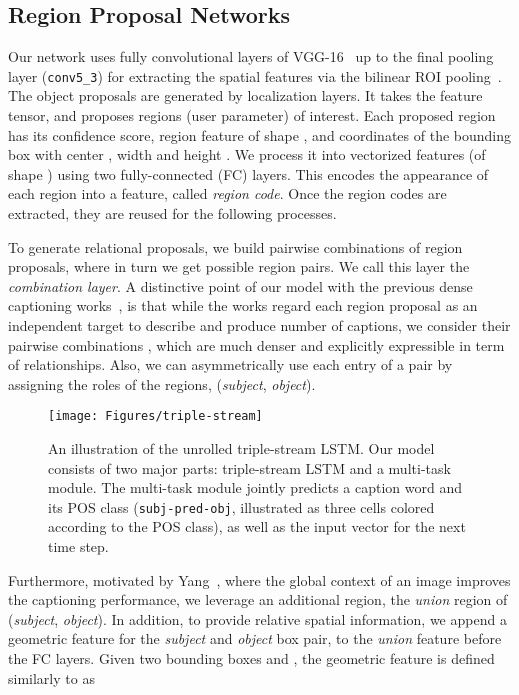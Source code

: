\documentclass[10pt,twocolumn,letterpaper]{article}
\begin{document}
\subsection{Region Proposal Networks}
Our network uses fully convolutional layers of VGG-16~\cite{simonyan2014very} up to the final pooling layer (\ie\texttt{conv5\_3}) for extracting the spatial features via the bilinear ROI pooling~\cite{johnson2016densecap}.
The object proposals are generated by localization layers.
It takes the feature tensor, and proposes  regions (user parameter) of interest.
Each proposed region has its confidence score, region feature of shape , and coordinates  of the bounding box with center , width  and height .
We process it into vectorized features (of shape ) using two fully-connected (FC) layers. 
This encodes the appearance of each region into a feature, called \emph{region code}.
Once the region codes are extracted, they are reused for the following processes.

To generate relational proposals, we build pairwise combinations of  region proposals, where in turn we get  possible region pairs.
We call this layer the \emph{combination layer}.
A distinctive point of our model with the previous dense captioning works~\cite{johnson2016densecap,Yang_2017_CVPR}, is that while the works regard each region proposal as an independent target to describe and produce  number of captions, we consider their pairwise combinations , which are much denser and explicitly expressible in term of relationships. 
Also, we can asymmetrically use each entry of a pair by assigning the roles of the regions, \ie (\emph{subject}, \emph{object}).


\begin{figure*}[t]
	\centering
	\texttt{[image: Figures/triple-stream]}
	\caption{An illustration of the unrolled triple-stream LSTM. 
		Our model consists of two major parts: triple-stream LSTM and a multi-task module.
		The multi-task module jointly predicts a caption word and its POS class (\texttt{subj-pred-obj}, illustrated as three cells colored according to the POS class), as well as the input vector for the next time step.
        \vspace{-4mm}}
	\label{fig:triple-stream}
\end{figure*}


Furthermore, motivated by Yang~\etal, where the global context of an image improves the captioning performance, we leverage an additional region, the \emph{union} region  of (\emph{subject}, \emph{object}).
In addition, to provide relative spatial information, we append a geometric feature for the \emph{subject} and \emph{object} box pair, \ie to the \emph{union} feature before the FC layers.
Given two bounding boxes  and , the geometric feature  is defined similarly to \cite{peyre2017weakly} as\vspace{-1mm}
\end{document}
